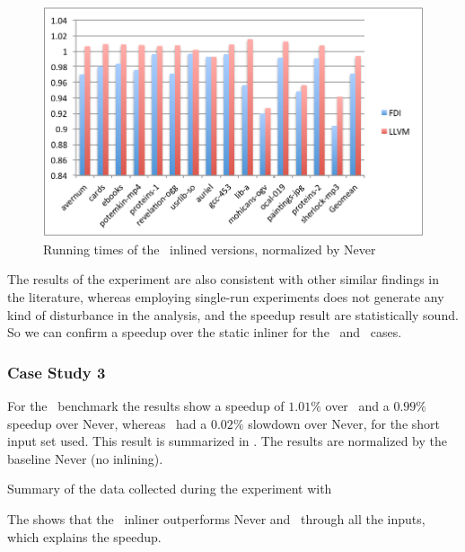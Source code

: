 \begin{figure}
  \centering
  \includegraphics[width=1.00\linewidth]{Figures/speedupgzipall}
  \caption{Running times of the \gzip\ inlined versions, normalized by Never}
  \label{fig:speedupz}
\end{figure}

The results of the experiment are also consistent with other similar findings in the literature, whereas employing single-run experiments does not generate any kind of disturbance in the analysis, and the speedup result are statistically sound. So we can confirm a speedup over the static inliner for the \bzip\ and \gzip\ cases.

\subsubsection{Case Study 3 \gobmk}

For the \gobmk\ benchmark the results show a speedup of $1.01 \%$ over \llvm\, and a $0.99 \%$ speedup over Never, whereas \llvm\ had a $0.02 \%$ slowdown over Never, for the short input set used. This result is summarized in . The results are normalized by the baseline Never (no inlining).

\begin{table}
  \centering
  \begin{tiny}
  
  \end{tiny}
  \caption{Summary of the data collected during the experiment with \gobmk}
  \label{tab:speedupgobmk}
\end{table}

The  shows that the \FDI\ inliner outperforms Never and \llvm\ through all the inputs, which explains the speedup.

